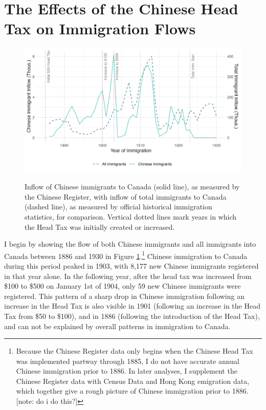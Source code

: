 
\section{The Effects of the Chinese Head Tax on Immigration Flows}




\begin{figure}[h!]
    \centering 
    \caption{Inflow of Chinese immigrants to Canada (solid line), as measured by the Chinese Register, with inflow of total immigrants to Canada (dashed line), as measured by official historical immigration statistics, for comparison. Vertical dotted lines mark years in which the Head Tax was initially created or increased.}
    \includegraphics[width=\textwidth]{../../figs/fig2_flow.png}
    \label{fig:inflow}
\end{figure}

I begin by showing the flow of both Chinese immigrants and all immigrants into Canada between 1886 and 1930 in Figure \ref{fig:inflow}.\footnote{Because the Chinese Register data only begins when the Chinese Head Tax was implemented partway through 1885, I do not have accurate annual Chinese immigration prior to 1886. In later analyses, I supplement the Chinese Register data with Census Data and Hong Kong emigration data, which together give a rough picture of Chinese immigration prior to 1886. [note: do i do this?]} 
Chinese immigration to Canada during this period peaked in 1903, with 8,177 new Chinese immigrants registered in that year alone. In the following year, after the head tax was increased from \$100 to \$500 on January 1st of 1904, only 59 new Chinese immigrants were registered. This pattern of a sharp drop in Chinese immigration following an increase in the Head Tax is also visible in 1901 (following an increase in the Head Tax from \$50 to \$100), and in 1886 (following the introduction of the Head Tax), and can not be explained by overall patterns in immigration to Canada.

